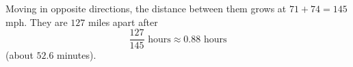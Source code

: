 Moving in opposite directions, the distance between them grows at $71+74=145$ mph. They are $127$ miles apart after
\[
\dfrac{127}{145}\text{ hours}\approx\boxed{0.88\text{ hours}}
\]
(about $52.6$ minutes).
